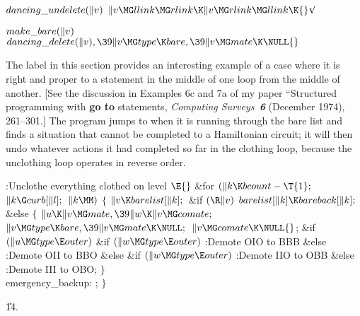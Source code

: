\Y\B\4\D$\\{dancing\_undelete}(\|v)$ \5
$\|v\MG\\{llink}\MG\\{rlink}\K\|v\MG\\{rlink}\MG\\{llink}\K{}$\|v\par
\B\4\D$\\{make\_bare}(\|v)$ \5
$\\{dancing\_delete}(\|v),\39\|v\MG\\{type}\K\\{bare},\39\|v\MG\\{mate}\K%
\NULL{}$\par
\fi

The  label in this section
provides
an interesting example of a case where it is right and proper to
 a statement in the middle of one loop from the middle of another.
[See the discussion in Examples 6c and 7a of my paper ``Structured programming
with {\bf go to} statements, {\sl Computing Surveys\/~\bf6} (December 1974),
261--301.] The program jumps to  when it is running
through the bare list and finds a situation that cannot be completed
to a Hamiltonian circuit; it will then undo whatever actions it had
completed so far in the clothing loop, because the unclothing loop
operates in reverse order.

\Y\B\4:Unclothe everything clothed on level \X${}\E{}$\6
\&{for} ${}(\|k\K\\{bcount}-\T{1};{}$ ${}\|k\G\\{curb}[\|l];{}$ ${}\|k\MM){}$\5
${}\{{}$\1\6
${}\|v\K\\{barelist}[\|k];{}$\6
\&{if} ${}(\R\|v){}$\1\5
${}\\{barelist}[\|k]\K\\{bareback}[\|k];{}$\2\6
\&{else}\5
${}\{{}$\1\6
${}\|u\K\|v\MG\\{mate},\39\|w\K\|v\MG\\{comate};{}$\6
${}\|v\MG\\{type}\K\\{bare},\39\|v\MG\\{mate}\K\NULL;{}$\6
${}\|v\MG\\{comate}\K\NULL{}$;\6
\&{if} ${}(\|u\MG\\{type}\E\\{outer}){}$\1\6
\&{if} ${}(\|w\MG\\{type}\E\\{outer}){}$\1\5
:Demote OIO to BBB\X\2\6
\&{else}\1\5
:Demote OII to BBO\X\2\2\6
\&{else} \&{if} ${}(\|w\MG\\{type}\E\\{outer}){}$\1\5
:Demote IIO to OBB\X\2\6
\&{else}\1\5
:Demote III to OBO\X;\2\6
\4${}\}{}$\2\6
\4\\{emergency\_backup}:\5
;\6
\4${}\}{}$\2\par
\U14.\fi

